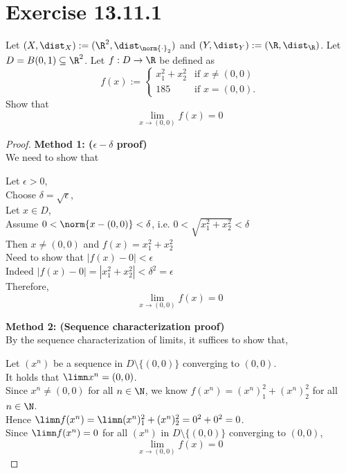 \documentclass{assignment}
\begin{document}
\newpage

\section{Exercise 13.11.1}
\begin{problem}
    Let $(X, \dist_X) := (\R^2, \dist_{\norm{\cdot}_2})$ and $(Y, \dist_Y):=(\R,\dist_\R)$. Let $D = B(0,1) \subseteq \R^2$.
    Let $f: D \to \R$ be defined as
    $$f(x) := \begin{cases}
        x_1^2+x_2^2 & \text{if } x \ne (0,0) \\
        185 & \text{if } x = (0,0).
    \end{cases}$$
    Show that
    $$\lim_{x\to(0,0)}f(x)=0$$
\end{problem}
\begin{proof}
    \textbf{Method 1: ($\epsilon-\delta$ proof)} \\
    We need to show that 
    \begin{myCenter}
    \end{myCenter}
    Let $\epsilon > 0$, \\
    Choose $\delta = \sqrt{\epsilon}$, \\
    Let $x \in D$, \\
    Assume $0 < \norm{x - (0,0)} < \delta$, i.e. $0 < \sqrt{x_1^2 + x_2^2} < \delta$ \\
    Then $x \ne (0,0)$ and $f(x) = x_1^2 + x_2^2$ \\
    Need to show that $|f(x) - 0| < \epsilon$ \\
    Indeed $|f(x) - 0| = |x_1^2+x_2^2| < \delta^2 = \epsilon$\\
    Therefore,
    $$\lim_{x \to (0, 0)} f(x) = 0$$

    \textbf{Method 2: (Sequence characterization proof)} \\
    By the sequence characterization of limits, it suffices to show that, 
    \begin{myCenter}
    \end{myCenter}
    Let $(x^n)$ be a sequence in $D \setminus \{(0, 0)\}$ converging to $(0, 0)$. \\
    It holds that $\limn x^n = (0,0)$. \\
    Since $x^n \ne (0,0)$ for all $n \in \N$, we know $f(x^n) = (x^n)_1^2 + (x^n)_2^2$ for all $n \in \N$. \\
    Hence $\limn f(x^n) = \limn (x^n)_1^2 + (x^n)_2^2 = 0^2 + 0^2 = 0$. \\
    Since $\limn f(x^n) = 0$ for all $(x^n)$ in $D \setminus \{(0, 0)\}$ converging to $(0, 0)$, $$\lim_{x \to (0, 0)} f(x) = 0$$


\end{proof}
\end{document}
